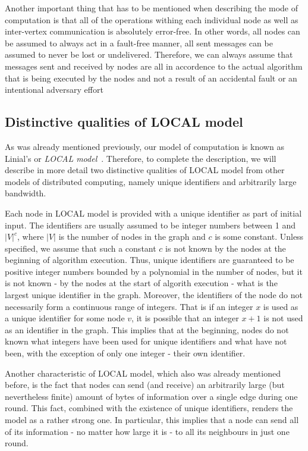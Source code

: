 Another important thing that has to be mentioned when describing the mode of computation
is that all of the operations withing each individual node as well as inter-vertex
communication is absolutely error-free. In other words, all nodes can be assumed to
always act in a fault-free manner, all sent messages can be assumed to never be lost
or undelivered. Therefore, we can always assume that messages sent and received by nodes
are all in accordence to the actual algorithm that is being executed by the nodes 
and not a result of an accidental fault or an intentional adversary effort

\subsection{Distinctive qualities of LOCAL model}

As was already mentioned previously, our model of computation is known
as Linial's or \emph{LOCAL model}~\cite{Linial1987}. Therefore, to complete the
description, we will describe in more detail two distinctive qualities of LOCAL model
from other models of distributed computing, namely unique identifiers and arbitrarily large
bandwidth.

Each node in LOCAL model is provided with a unique identifier as part of initial input.
The identifiers are usually assumed to be integer numbers between 1 and $|V|^c$, where
$|V|$ is the number of nodes in the graph and $c$ is some constant. Unless specified, we
assume that such a constant $c$ is not known by the nodes at the beginning of
algorithm execution. Thus, unique identifiers are guaranteed to be positive integer
numbers bounded by a polynomial in the number of nodes, but it is not known - by the nodes
at the start of algorith execution - what is the largest unique identifier in the graph. Moreover,
the identifiers of the node do not necessarily form a continuous range of integers. That is
if an integer $x$ is used as a unique identifier for some node $v$, it is possible
that an integer $x+1$ is not used as an identifier in the graph. This implies that at
the beginning, nodes do not known what integers have been used for unique identifiers
and what have not been, with the exception of only one integer - their own identifier.

Another characteristic of LOCAL model, which also was already mentioned before, is the fact
that nodes can send (and receive) an arbitrarily large (but nevertheless finite)
amount of bytes of information over a single edge during one round. This fact,
combined with the existence of unique identifiers, renders the model as a rather strong one.
In particular, this implies that a node can send all of its information - no matter how
large it is - to all its neighbours in just one round.

